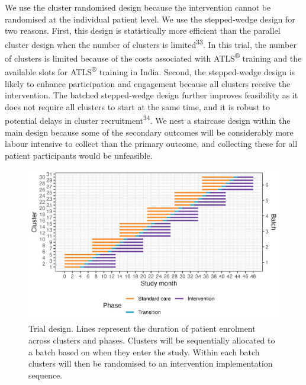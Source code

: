 \documentclass[
]{scrartcl}
\begin{document}
We use the cluster randomised design because the intervention cannot be
randomised at the individual patient level. We use the stepped-wedge
design for two reasons. First, this design is statistically more
efficient than the parallel cluster design when the number of clusters
is limited\textsuperscript{33}. In this trial, the number of clusters is
limited because of the costs associated with ATLS\textsuperscript{®}
training and the available slots for ATLS\textsuperscript{®} training in
India. Second, the stepped-wedge design is likely to enhance
participation and engagement because all clusters receive the
intervention. The batched stepped-wedge design further improves
feasibility as it does not require all clusters to start at the same
time, and it is robust to potential delays in cluster
recruitment\textsuperscript{34}. We nest a staircase design within the
main design because some of the secondary outcomes will be considerably
more labour intensive to collect than the primary outcome, and
collecting these for all patient participants would be unfeasible.

\begin{figure}

{\centering \includegraphics[width=5.9in,height=\textheight]{trial-design-figure-30-clusters-5-sequences-6-batches-6-batches-overlap-4-min-standard-care-4-min-intervention-1-transition-months-0-transition-overlap.0-staircase-months.png}

}

\caption{\label{fig-trial-design}Trial design. Lines represent the
duration of patient enrolment across clusters and phases. Clusters will
be sequentially allocated to a batch based on when they enter the study.
Within each batch clusters will then be randomised to an intervention
implementation sequence.}

\end{figure}
\end{document}
